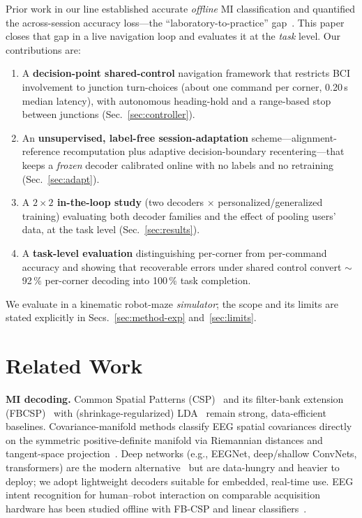 \documentclass[10pt,journal]{IEEEtran}
\begin{document}
Prior work in our line established accurate \emph{offline} MI classification and quantified the
across-session accuracy loss---the ``laboratory-to-practice'' gap~\cite{ownRobustMI2025,ownDualValidation2025}.
This paper closes that gap in a live navigation loop and evaluates it at the \emph{task} level.
Our contributions are:
\begin{enumerate}
\item A \textbf{decision-point shared-control} navigation framework that restricts BCI
involvement to junction turn-choices (about one command per corner, 0.20\,s median latency),
with autonomous heading-hold and a range-based stop between junctions (Sec.~\ref{sec:controller}).
\item An \textbf{unsupervised, label-free session-adaptation} scheme---alignment-reference
recomputation plus adaptive decision-boundary recentering---that keeps a \emph{frozen} decoder
calibrated online with no labels and no retraining (Sec.~\ref{sec:adapt}).
\item A \textbf{$2{\times}2$ in-the-loop study} (two decoders $\times$ personalized/generalized
training) evaluating both decoder families and the effect of pooling users' data, at the task
level (Sec.~\ref{sec:results}).
\item A \textbf{task-level evaluation} distinguishing per-corner from per-command accuracy and
showing that recoverable errors under shared control convert $\sim$92\,\% per-corner decoding
into 100\,\% task completion.
\end{enumerate}
We evaluate in a kinematic robot-maze \emph{simulator}; the scope and its limits are stated
explicitly in Secs.~\ref{sec:method-exp} and~\ref{sec:limits}.

\section{Related Work}
\textbf{MI decoding.} Common Spatial Patterns (CSP)~\cite{ramoser2000csp,blankertz2008csp} and
its filter-bank extension (FBCSP)~\cite{ang2008fbcsp,ang2012fbcsp} with (shrinkage-regularized)
LDA~\cite{blankertz2011shrinkage,ledoit2004shrinkage} remain strong, data-efficient baselines.
Covariance-manifold methods classify EEG spatial covariances directly on the symmetric
positive-definite manifold via Riemannian distances and tangent-space
projection~\cite{barachant2012riemann,barachant2013tangent,congedo2017primer,yger2017review}.
Deep networks (e.g., EEGNet, deep/shallow ConvNets, transformers) are the modern
alternative~\cite{lawhern2018eegnet,schirrmeister2017deep,song2023conformer,altaheri2023atcnet,roy2019dlreview}
but are data-hungry and heavier to deploy; we adopt lightweight decoders suitable for embedded,
real-time use. EEG intent recognition for human--robot interaction on comparable acquisition
hardware has been studied offline with FB-CSP and linear
classifiers~\cite{labAssessmentHRI2024,labComparative2024}.
\end{document}
